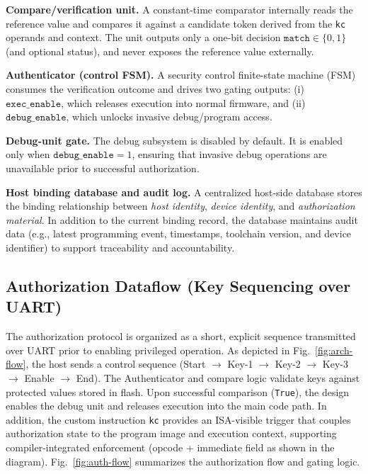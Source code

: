 \textbf{Compare/verification unit.} A constant-time comparator internally reads the reference value and compares it against a candidate token derived from the \texttt{kc} operands and context. The unit outputs only a one-bit decision \(\texttt{match} \in \{0,1\}\) (and optional status), and never exposes the reference value externally.

\textbf{Authenticator (control FSM).} A security control finite-state machine (FSM) consumes the verification outcome and drives two gating outputs:
(i) \(\texttt{exec\_enable}\), which releases execution into normal firmware, and
(ii) \(\texttt{debug\_enable}\), which unlocks invasive debug/program access.

\textbf{Debug-unit gate.} The debug subsystem is disabled by default. It is enabled only when \(\texttt{debug\_enable}=1\), ensuring that invasive debug operations are unavailable prior to successful authorization.

\textbf{Host binding database and audit log.} A centralized host-side database stores the binding relationship between \emph{host identity}, \emph{device identity}, and \emph{authorization material}. In addition to the current binding record, the database maintains audit data (e.g., latest programming event, timestamps, toolchain version, and device identifier) to support traceability and accountability.

\subsection{Authorization Dataflow (Key Sequencing over UART)}
\label{subsec:auth-dataflow}
The authorization protocol is organized as a short, explicit sequence transmitted over UART prior to enabling privileged operation. As depicted in Fig.~\ref{fig:arch-flow}, the host sends a control sequence (Start $\rightarrow$ Key-1 $\rightarrow$ Key-2 $\rightarrow$ Key-3 $\rightarrow$ Enable $\rightarrow$ End). The Authenticator and compare logic validate keys against protected values stored in flash. Upon successful comparison (\texttt{True}), the design enables the debug unit and releases execution into the main code path. In addition, the custom instruction \texttt{kc} provides an ISA-visible trigger that couples authorization state to the program image and execution context, supporting compiler-integrated enforcement (opcode + immediate field as shown in the diagram). Fig.~\ref{fig:auth-flow} summarizes the authorization flow and gating logic.

